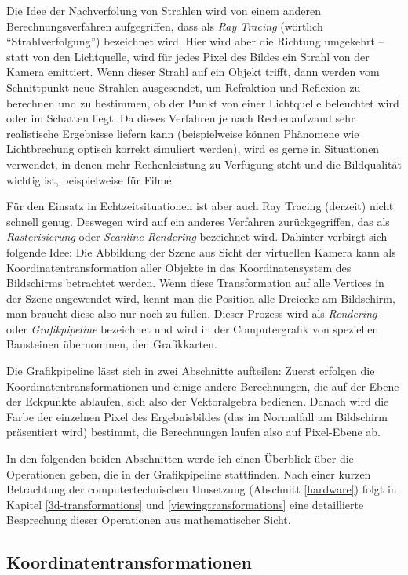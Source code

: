 Die Idee der Nachverfolung von Strahlen wird von einem anderen Berechnungsverfahren aufgegriffen, dass als \emph{Ray Tracing} (wörtlich \enquote{Strahlverfolgung}) bezeichnet wird. Hier wird aber die Richtung umgekehrt -- statt von den Lichtquelle, wird für jedes Pixel des Bildes ein Strahl von der Kamera emittiert. Wenn dieser Strahl auf ein Objekt trifft, dann werden vom Schnittpunkt neue Strahlen ausgesendet, um Refraktion und Reflexion zu berechnen und zu bestimmen, ob der Punkt von einer Lichtquelle beleuchtet wird oder im Schatten liegt. Da dieses Verfahren je nach Rechenaufwand sehr realistische Ergebnisse liefern kann (beispielweise können Phänomene wie Lichtbrechung optisch korrekt simuliert werden), wird es gerne in Situationen verwendet, in denen mehr Rechenleistung zu Verfügung steht und die Bildqualität wichtig ist, beispielweise für Filme.

Für den Einsatz in Echtzeitsituationen ist aber auch Ray Tracing (derzeit) nicht schnell genug. Deswegen wird auf ein anderes Verfahren zurückgegriffen, das als \emph{Rasterisierung} oder \emph{Scanline Rendering} bezeichnet wird. Dahinter verbirgt sich folgende Idee: Die Abbildung der Szene aus Sicht der virtuellen Kamera kann als Koordinatentransformation aller Objekte in das Koordinatensystem des Bildschirms betrachtet werden. Wenn diese Transformation auf alle Vertices in der Szene angewendet wird, kennt man die Position alle Dreiecke am Bildschirm, man braucht diese also nur noch zu füllen. Dieser Prozess wird als \emph{Rendering-} oder \emph{Grafikpipeline} bezeichnet und wird in der Computergrafik von speziellen Bausteinen übernommen, den Grafikkarten.

Die Grafikpipeline lässt sich in zwei Abschnitte aufteilen: Zuerst erfolgen die Koordinatentransformationen und einige andere Berechnungen, die auf der Ebene der Eckpunkte ablaufen, sich also der Vektoralgebra bedienen. Danach wird die Farbe der einzelnen Pixel des Ergebnisbildes (das im Normalfall am Bildschirm präsentiert wird) bestimmt, die Berechnungen laufen also auf Pixel-Ebene ab.

In den folgenden beiden Abschnitten werde ich einen Überblick über die Operationen geben, die in der Grafikpipeline stattfinden. Nach einer kurzen Betrachtung der computertechnischen Umsetzung (Abschnitt \ref{hardware}) folgt in Kapitel \ref{3d-transformations} und \ref{viewingtransformations} eine detaillierte Besprechung dieser Operationen aus mathematischer Sicht.


\subsection{Koordinatentransformationen}
\label{coordinatesystems}

